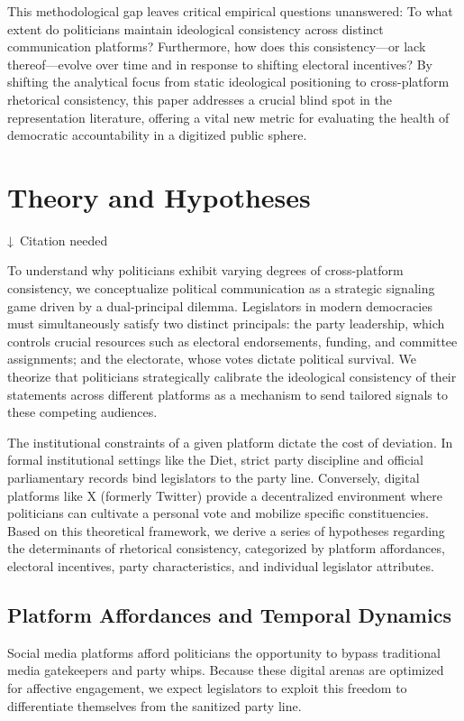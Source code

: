 \documentclass[11pt,letterpaper]{article}
\theoremstyle{plain}
\begin{document}
This methodological gap leaves critical empirical questions unanswered: To what extent do politicians maintain ideological consistency across distinct communication platforms? Furthermore, how does this consistency—or lack thereof—evolve over time and in response to shifting electoral incentives? By shifting the analytical focus from static ideological positioning to cross-platform rhetorical consistency, this paper addresses a crucial blind spot in the representation literature, offering a vital new metric for evaluating the health of democratic accountability in a digitized public sphere.

\section{Theory and Hypotheses}
\label{sec:theory}
{\color{red}↓~Citation needed}

To understand why politicians exhibit varying degrees of cross-platform consistency, we conceptualize political communication as a strategic signaling game driven by a dual-principal dilemma. Legislators in modern democracies must simultaneously satisfy two distinct principals: the party leadership, which controls crucial resources such as electoral endorsements, funding, and committee assignments; and the electorate, whose votes dictate political survival. We theorize that politicians strategically calibrate the ideological consistency of their statements across different platforms as a mechanism to send tailored signals to these competing audiences. 

The institutional constraints of a given platform dictate the cost of deviation. In formal institutional settings like the Diet, strict party discipline and official parliamentary records bind legislators to the party line. Conversely, digital platforms like X (formerly Twitter) provide a decentralized environment where politicians can cultivate a personal vote and mobilize specific constituencies. Based on this theoretical framework, we derive a series of hypotheses regarding the determinants of rhetorical consistency, categorized by platform affordances, electoral incentives, party characteristics, and individual legislator attributes.
\subsection{Platform Affordances and Temporal Dynamics}
Social media platforms afford politicians the opportunity to bypass traditional media gatekeepers and party whips. Because these digital arenas are optimized for affective engagement, we expect legislators to exploit this freedom to differentiate themselves from the sanitized party line. 
\end{document}
